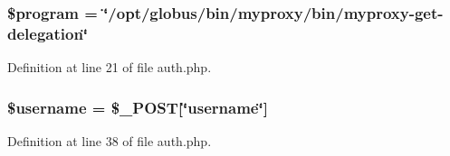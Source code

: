 \subsubsection{\setlength{\rightskip}{0pt plus 5cm}\$program = \char`\"{}/opt/globus/bin/myproxy/bin/myproxy-get-delegation\char`\"{}}\label{auth_8php_a3}




Definition at line 21 of file auth.php.
\subsubsection{\setlength{\rightskip}{0pt plus 5cm}\$username = \$\_\-POST[\char`\"{}username\char`\"{}]}\label{auth_8php_a0}




Definition at line 38 of file auth.php.